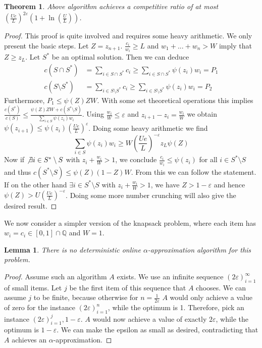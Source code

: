 \documentclass[a4paper, 12pt]{article}
\newtheorem{theorem}{Theorem}[section]
\newtheorem{lemma}{Lemma}[section]
\begin{document}
	\begin{theorem}
		Above algorithm achieves a competitive ratio of at most $\left(\frac{Ue}{L}\right)^{2\varepsilon}\left(1+\ln \left(\frac{U}{L}\right)\right)$. 
	\end{theorem}
	\begin{proof}
		This proof is quite involved and requires some heavy arithmetic. We only present the basic steps.
		Let $Z = z_{n+1}$. $\frac{c_i}{w_i} \geq L$ and $w_1+...+w_n > W$ imply that $Z \geq z_L$. Let $S^*$ be an optimal solution. Then we can deduce \begin{align}
			c(S \cap S^*) &= \sum_{i \in S\cap S^*} c_i \geq \sum_{i \in S\cap S^*}\psi(z_i)w_i = P_1\\
			c(S\setminus S^*) &= \sum_{i \in S\setminus S^*} c_i \geq \sum_{i \in S\setminus S^*} \psi(z_i)w_i = P_2
		\end{align}
	Furthermore, \(P_1 \leq \psi(Z)ZW\). With some set theoretical operations this implies $\frac{c(S^*)}{c(S)} \leq \frac{\psi(Z)ZW + c(S^*\setminus S)}{\sum_{i \in S}\psi(z_i)w_i}$. Using $\frac{w_i}{W} \leq \varepsilon$ and $z_{i+1} - z_i = \frac{w_i}{W}$ we obtain $\psi(z_{i+1}) \leq \psi(z_i)\left(\frac{Ue}{L}\right)^\varepsilon$. Doing some heavy arithmetic we find \[\sum_{i \in S}\psi(z_i)w_i \geq W\left(\frac{Ue}{L}\right)^{-\varepsilon}z_L\psi(Z)\]
	Now if $\not\exists i \in S^*\setminus S$ with $z_i + \frac{w_i}{W} > 1$, we conclude $\frac{c_i}{w_i} \leq \psi(z_i)$ for all $i \in S^*\setminus S$ and thus $c(S^*\setminus S) \leq \psi(Z)(1-Z)W$. From this we can follow the statement.\\
	If on the other hand $\exists i \in S^* \setminus S$ with $z_i + \frac{w_i}{W} > 1$, we have $Z > 1-\varepsilon$ and hence $\psi(Z) > U\left(\frac{Ue}{L}\right)^{-\varepsilon}$. Doing some more number crunching will also give the desired result.
	\end{proof}
	We now consider a simpler version of the knapsack problem, where each item has $w_i = c_i \in [0,1] \cap \mathbb{Q}$ and $W=1$.
	\begin{lemma}
		There is no deterministic online $\alpha$-approximation algorithm for this problem.
	\end{lemma}  
	\begin{proof}
		Assume such an algorithm $A$ exists. We use an infinite sequence $(2\varepsilon)_{i=1}^\infty$ of small items. Let $j$ be the first item of this sequence that $A$ chooses. We can assume $j$ to be finite, because otherwise for $n = \frac{1}{2\varepsilon}$ $A$ would only achieve a value of zero for the instance $(2\varepsilon)_{i=1}^n$, while the optimum is 1. Therefore, pick an instance $(2\varepsilon)_{i=1}^j, 1-\varepsilon$. $A$ would now achieve a value of exactly $2\varepsilon$, while the optimum is $1-\varepsilon$. We can make the epsilon as small as desired, contradicting that $A$ achieves an $\alpha$-approximation. 
	\end{proof}
\end{document}
